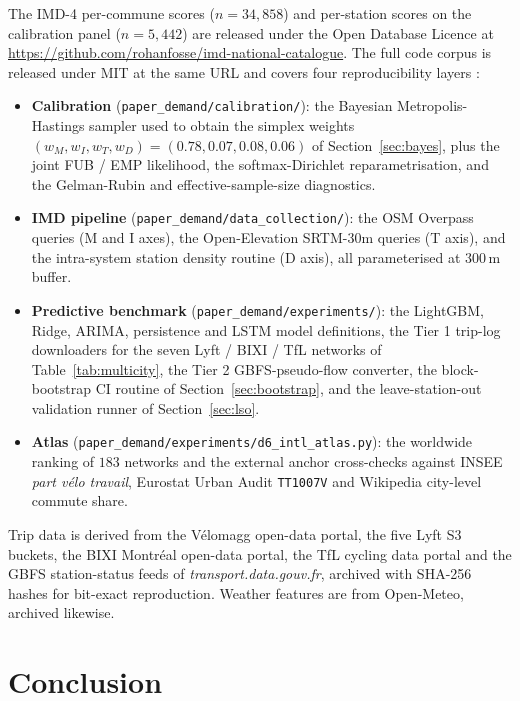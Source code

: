 \documentclass[11pt,a4paper]{article}
\begin{document}
The IMD-4 per-commune scores ($n = 34{,}858$) and per-station
scores on the calibration panel ($n = 5{,}442$) are released
under the Open Database Licence at
\url{https://github.com/rohanfosse/imd-national-catalogue}.
The full code corpus is released under MIT at the same URL and
covers four reproducibility layers :
\begin{itemize}[label=$\bullet$,leftmargin=*]
    \item \textbf{Calibration} (\texttt{paper\_demand/calibration/}):
      the Bayesian Metropolis-Hastings sampler used to obtain the
      simplex weights $(w_M, w_I, w_T, w_D) = (0.78, 0.07, 0.08, 0.06)$
      of Section~\ref{sec:bayes}, plus the joint FUB / EMP
      likelihood, the softmax-Dirichlet reparametrisation, and the
      Gelman-Rubin and effective-sample-size diagnostics.
    \item \textbf{IMD pipeline}
      (\texttt{paper\_demand/data\_collection/}): the OSM Overpass
      queries (M and I axes), the Open-Elevation SRTM-30m queries
      (T axis), and the intra-system station density routine
      (D axis), all parameterised at $300$\,m buffer.
    \item \textbf{Predictive benchmark}
      (\texttt{paper\_demand/experiments/}): the LightGBM, Ridge,
      ARIMA, persistence and LSTM model definitions, the
      Tier 1 trip-log downloaders for the seven Lyft / BIXI /
      TfL networks of Table~\ref{tab:multicity}, the Tier 2
      GBFS-pseudo-flow converter, the block-bootstrap CI routine
      of Section~\ref{sec:bootstrap}, and the leave-station-out
      validation runner of Section~\ref{sec:lso}.
    \item \textbf{Atlas}
      (\texttt{paper\_demand/experiments/d6\_intl\_atlas.py}):
      the worldwide ranking of $183$ networks and the external
      anchor cross-checks against INSEE \emph{part v\'elo
      travail}, Eurostat Urban Audit \texttt{TT1007V} and
      Wikipedia city-level commute share.
\end{itemize}
Trip data is derived from the V\'elomagg open-data portal, the
five Lyft S3 buckets, the BIXI Montr\'eal open-data portal, the
TfL cycling data portal and the GBFS station-status feeds of
\emph{transport.data.gouv.fr}, archived with SHA-256 hashes for
bit-exact reproduction.  Weather features are from Open-Meteo,
archived likewise.

\section{Conclusion}
\label{sec:conclusion}
\end{document}
